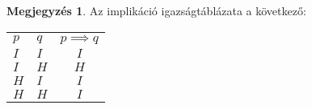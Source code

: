 \documentclass[a4paper,12pt]{article}
\theoremstyle{definition}
\newtheorem*{remark}{Megjegyzés}
\begin{document}
    \begin{solution}
        \begin{remark}
            Az implikáció igazságtáblázata a következő:
            \begin{table}[H]
                \centering
                \begin{tabular}{llc}
                    \textbf{$p$} & \textbf{$q$} & \textbf{$p \implies q$} \\
                    $I$ & $I$ & $I$ \\
                    $I$ & $H$ & $H$ \\
                    $H$ & $I$ & $I$ \\
                    $H$ & $H$ & $I$ \\
                \end{tabular}
                \label{tab:}
            \end{table}
        \end{remark}
        \begin{figure}[H]
            \centering
            \label{fig:figure2}
            \begin{tikzpicture}[x=0.75pt,y=0.75pt,yscale=-1,xscale=1]


\end{tikzpicture}
\end{figure}
\end{solution}
\end{document}
